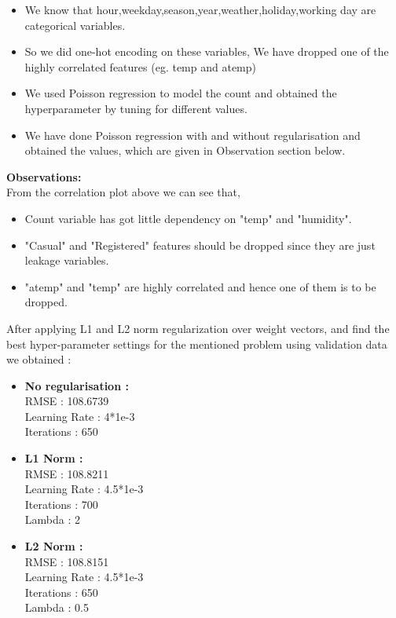 \documentclass[english,a4paper,12pt]{article}
\begin{document}
\begin{enumerate}
\begin{itemize}
\item We know that hour,weekday,season,year,weather,holiday,working day are categorical variables. 
\item So we did one-hot encoding on these variables, We have dropped one of the highly correlated features (eg. temp and atemp)
\item We used Poisson regression to model the count and obtained the hyperparameter by tuning for different values.
\item We have done Poisson regression with and without regularisation and obtained the values, which are given in Observation section below.\\
\end{itemize}
\textbullet\textbf{Observations:}\\
From the correlation plot above we can see that,
\begin{itemize}
    \item Count variable has got little dependency on "temp" and "humidity".
    \item "Casual" and "Registered" features should be dropped since they are just leakage variables.
    \item "atemp" and "temp" are highly correlated and hence one of them is to be dropped.
\end{itemize}
\newpage
\textbullet After applying L1 and L2 norm regularization over weight vectors, and find the best hyper-parameter
settings for the mentioned problem using validation data we obtained :
\begin{itemize}
    \item \textbf{No regularisation :}\\
    RMSE : 108.6739\\
    Learning Rate : 4*1e-3\\
    Iterations : 650
    \item \textbf{L1 Norm :}\\
    RMSE : 108.8211 \\
    Learning Rate : 4.5*1e-3\\
    Iterations : 700\\
    Lambda : 2
    \item\textbf{L2 Norm :} \\
    RMSE : 108.8151 \\
    Learning Rate : 4.5*1e-3\\
    Iterations : 650\\
    Lambda : 0.5
\end{itemize}


\end{enumerate}
\end{document}
